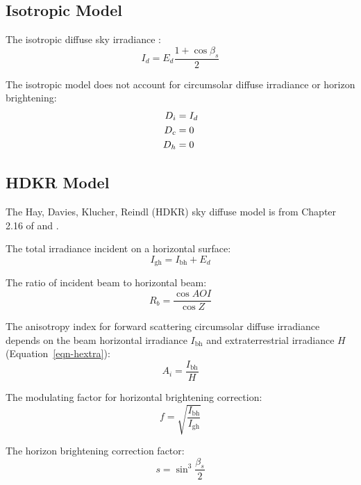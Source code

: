 \documentclass[12pt,letterpaper]{article}
\newcommand\AOI{\ensuremath{\mathit{AOI}}}
\begin{document}
\subsection{Isotropic Model}

The isotropic diffuse sky irradiance \citep{liu1963}:
\begin{equation}
I_d = E_d\frac{1 + \cos\beta_s}{2}
\end{equation}

The isotropic model does not account for circumsolar diffuse irradiance or horizon brightening:
\begin{align}
D_i &= I_d \notag\\
D_c &= 0 \notag\\
D_h &= 0
\end{align}

\subsection{HDKR Model}

The Hay, Davies, Klucher, Reindl (HDKR) sky diffuse model is from Chapter 2.16 of \citet{duffie2013} and \citet{reindl1988}.

The total irradiance incident on a horizontal surface:
\begin{equation}
I_{\mathrm{gh}} = I_{\mathrm{bh}} + E_d
\end{equation}

The ratio of incident beam to horizontal beam:
\begin{equation}
R_b = \frac{\cos\AOI}{\cos Z}
\end{equation}

The anisotropy index for forward scattering circumsolar diffuse irradiance depends on the beam horizontal irradiance $I_{\mathrm{bh}}$ and extraterrestrial irradiance $H$ (Equation~\ref{eqn-hextra}):
\begin{equation}
A_i = \frac{I_{\mathrm{bh}}}{H}
\end{equation}

The modulating factor for horizontal brightening correction:
\begin{equation}
f =\sqrt{\frac{I_{\mathrm{bh}}}{I_{\mathrm{gh}}}}
\end{equation}

The horizon brightening correction factor:
\begin{equation}
s =\sin^3\frac{\beta_s}{2}
\end{equation}
\end{document}

